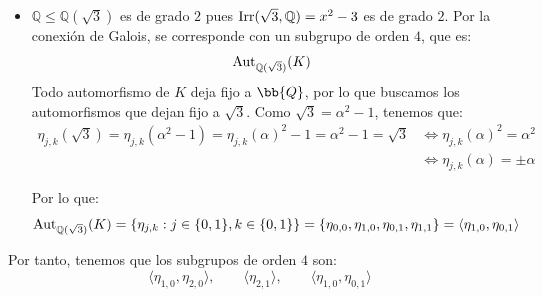 \begin{ejemplo}
\begin{itemize}
\begin{itemize}
            \item $\mathbb{Q}\leq \mathbb{Q}(\sqrt{3})$ es de grado $2$ pues $\operatorname{Irr}(\sqrt{3},\mathbb{Q}) = x^2-3$ es de grado $2$. Por la conexión de Galois, se corresponde con un subgrupo de orden $4$, que es:
            \begin{equation*}
                \operatorname{Aut}_{\mathbb{Q}(\sqrt{3})}(K)
            \end{equation*}
            Todo automorfismo de $K$ deja fijo a $\bb{Q}$, por lo que buscamos los automorfismos que dejan fijo a $\sqrt{3}$. Como $\sqrt{3} = \alpha^2-1$, tenemos que:
            \begin{align*}
                \eta_{j,k}(\sqrt{3}) = \eta_{j,k}(\alpha^2-1) = \eta_{j,k}(\alpha)^2-1 = \alpha^2-1 = \sqrt{3} &\iff \eta_{j,k}(\alpha)^2 = \alpha^2 \\ & \iff \eta_{j,k}(\alpha) = \pm\alpha
            \end{align*}

            Por lo que:
            \begin{equation*}
                \operatorname{Aut}_{\mathbb{Q}(\sqrt{3})}(K) = \{\eta_{j,k} : j \in \{0,1\}, k \in \{0,1\}\} = \{\eta_{0,0},\eta_{1,0},\eta_{0,1},\eta_{1,1}\} = \langle \eta_{1,0},\eta_{0,1}\rangle
            \end{equation*}
        \end{itemize}

        Por tanto, tenemos que los subgrupos de orden $4$ son:
        \begin{equation*}
            \langle \eta_{1,0},\eta_{2,0}\rangle, \qquad \langle \eta_{2,1} \rangle, \qquad \langle \eta_{1,0},\eta_{0,1}\rangle
        \end{equation*}
    \end{itemize}


\end{ejemplo}
